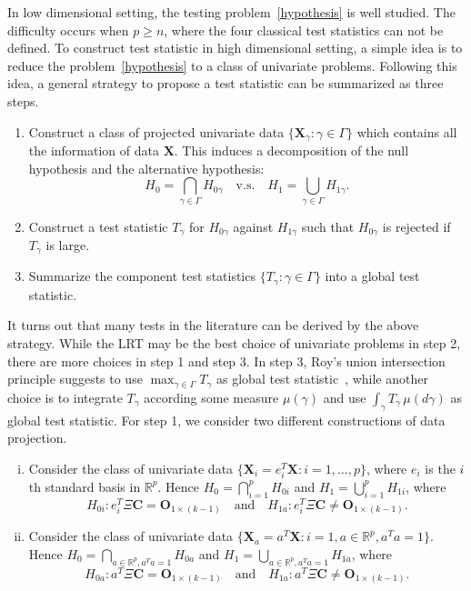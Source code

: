 \documentclass[12pt]{article} %
\newcommand{\bX}{\mathbf{X}}
\newcommand{\bC}{\mathbf{C}}
\newcommand{\bO}{\mathbf{O}}
\theoremstyle{definition}
\begin{document}
In low dimensional setting, the testing problem~\eqref{hypothesis} is well studied.
The difficulty occurs when $p\geq n$, where the four classical test statistics can not be defined.
To construct test statistic in high dimensional setting, a simple idea is to reduce the problem~\eqref{hypothesis} to a class of univariate problems.
Following this idea, a general strategy to propose a test statistic can be summarized as three steps.
\begin{enumerate}
    \item
       Construct a class of projected univariate data $\{\bX_{\gamma}:\gamma\in\Gamma\}$ which contains all the information of data $\bX$.
        This induces a decomposition of the null hypothesis and the alternative hypothesis:
        $$
        H_0=\bigcap_{\gamma\in\Gamma} H_{0\gamma} \quad \text{v.s.} \quad 
        H_1=\bigcup_{\gamma\in \Gamma} H_{1\gamma}.
        $$
    \item
        Construct a test statistic $T_\gamma$ for $H_{0\gamma}$ against $H_{1\gamma}$ such that $H_{0\gamma}$ is rejected if $T_{\gamma}$ is large.
    \item
        Summarize the component test statistics $\{T_{\gamma}:\gamma\in\Gamma\}$ into a global test statistic.
\end{enumerate}
It turns out that many tests in the literature can be derived by the above strategy.
While the LRT may be the best choice of univariate problems in step 2,
 there are more choices in step 1 and step 3.
In step 3, Roy's union intersection principle suggests to use $\max_{\gamma\in\Gamma}T_{\gamma}$ as global test statistic~\citep{Roy1953},
while another choice is to integrate $T_\gamma$ according some measure $\mu(\gamma)$ and use $\int_\gamma T_{\gamma}\,\mu(d\gamma)$ as global test statistic.
For step 1, we consider two different constructions of data projection.
\begin{enumerate}[(i)]
    \item
        Consider the class of univariate data $\{\bX_{i}=e_i^T \bX:i=1,\ldots,p\}$, where $e_i$ is the $i$th standard basis in $\mathbb{R}^p$.
        Hence $H_0=\bigcap_{i=1}^p H_{0i}$ and $H_1=\bigcup_{i=1}^p H_{1i}$, where
 $$
 H_{0i}: e_i^T \Xi \bC = \bO_{1\times (k-1)}\quad \text{and}\quad H_{1a} : e_i^T \Xi \bC \neq \bO_{1\times (k-1)}.
 $$
\item
    Consider the class of univariate data $\{\bX_{a}=a^T \bX:i=1,a\in\mathbb{R}^p, a^T a=1\}$.
        Hence $H_0=\bigcap_{a\in \mathbb{R}^p, a^T a=1}H_{0a}$ and $H_1=\bigcup_{a\in \mathbb{R}^p,a^T a=1}H_{1a}$, where
 $$
 H_{0a}: a^T \Xi \bC = \bO_{1\times (k-1)}\quad \text{and}\quad H_{1a} : a^T \Xi \bC \neq \bO_{1\times (k-1)}.
 $$
\end{enumerate}
\end{document}

